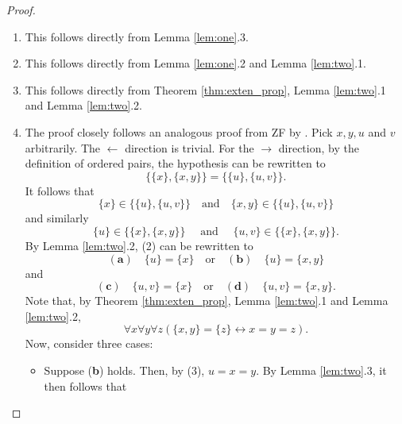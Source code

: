 \begin{proof}
    \leanok
    \leavevmode
    \begin{enumerate}
        \item This follows directly from Lemma \ref{lem:one}.3.
        \item This follows directly from Lemma \ref{lem:one}.2 and Lemma \ref{lem:two}.1.
        \item This follows directly from Theorem \ref{thm:exten_prop}, Lemma \ref{lem:two}.1 and Lemma \ref{lem:two}.2.
        \item  The proof closely follows an analogous proof from ZF by \cite{enderton1977elements}.
        Pick $x,y,u$ and $v$ arbitrarily. The $\leftarrow$ direction is trivial.
        For the $\rightarrow$ direction, by the definition of ordered pairs, the hypothesis can be rewritten to
        \begin{equation*}
            \{\{x\}, \{x,y\}\} = \{\{u\}, \{u,v\}\}.
        \end{equation*}
        It follows that
        \begin{equation}
            \{x\} \in \{\{u\}, \{u,v\}\}\quad\text{and}\quad \{x,y\} \in \{\{u\}, \{u,v\}\}
        \end{equation}
        and similarly
        \begin{equation}
            \{u\} \in \{\{x\}, \{x,y\}\}\quad\text{ and }\quad \{u,v\} \in \{\{x\}, \{x,y\}\}.
        \end{equation}
        By Lemma \ref{lem:two}.2, (2) can be rewritten to
        \begin{equation*}
            (\textbf{a})\quad\{u\}=\{x\}\quad\text{or}\quad (\textbf{b})\quad\{u\}=\{x,y\}
        \end{equation*}
        and
        \begin{equation*}
            (\textbf{c})\quad\{u,v\}=\{x\}\quad\text{or}\quad (\textbf{d})\quad\{u,v\}=\{x,y\}.
        \end{equation*}
        Note that, by Theorem \ref{thm:exten_prop}, Lemma \ref{lem:two}.1 and Lemma \ref{lem:two}.2,
        \begin{equation}
        \forall x \forall y \forall z (\{x,y\} = \{z\} \leftrightarrow x = y =z).
        \end{equation}
        Now, consider three cases:
        \begin{itemize}
            \item Suppose (\textbf{b}) holds. Then, by (3), $u=x=y$. By Lemma \ref{lem:two}.3, it then follows that 

\end{itemize}
\end{enumerate}
\end{proof}
